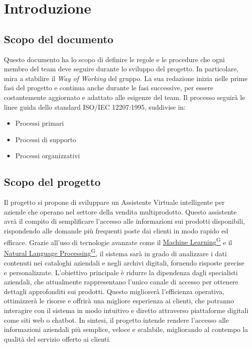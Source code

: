 \section{Introduzione}

\subsection{Scopo del documento}
Questo documento ha lo scopo di definire le regole e le procedure che ogni membro del team deve seguire durante 
lo sviluppo del progetto. In particolare, mira a stabilire il \textit{Way of Working} del gruppo. 
La sua redazione inizia nelle prime fasi del progetto e continua anche durante le fasi successive, 
per essere costantemente aggiornato e adattato alle esigenze del team. 
Il processo seguirà le linee guida dello standard ISO/IEC 12207:1995, suddivise in:
\begin{itemize}
    \item Processi primari
    \item Processi di supporto
    \item Processi organizzativi
\end{itemize}


\subsection{Scopo del progetto}
Il progetto si propone di sviluppare un Assistente Virtuale intelligente per aziende che operano nel 
settore della vendita multiprodotto. Questo assistente avrà il compito di semplificare l'accesso alle 
informazioni sui prodotti disponibili, rispondendo alle domande più frequenti poste dai clienti in modo rapido ed efficace.
Grazie all'uso di tecnologie avanzate come il \href{https://code7crusaders.github.io/docs/RTB/documentazione_interna/glossario.html#machine-learning}{Machine Learning\textsuperscript{G}} e il \href{https://code7crusaders.github.io/docs/RTB/documentazione_interna/glossario.html#natural-language-processing-nlp}{Natural Language Processing\textsuperscript{G}}, 
il sistema sarà in grado di analizzare i dati contenuti nei cataloghi aziendali e negli archivi digitali, 
fornendo risposte precise e personalizzate.
L’obiettivo principale è ridurre la dipendenza dagli specialisti aziendali, che attualmente rappresentano 
l’unico canale di accesso per ottenere dettagli approfonditi sui prodotti. Questo migliorerà l’efficienza 
operativa, ottimizzerà le risorse e offrirà una migliore esperienza ai clienti, che potranno interagire con 
il sistema in modo intuitivo e diretto attraverso piattaforme digitali come siti web o chatbot.
In sintesi, il progetto intende rendere l'accesso alle informazioni aziendali più semplice, veloce e scalabile, 
migliorando al contempo la qualità del servizio offerto ai clienti.


